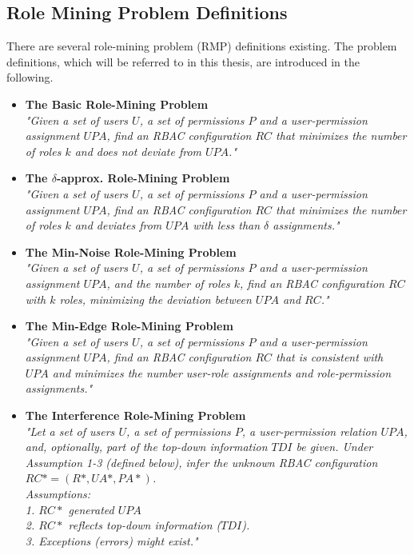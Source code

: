     \subsection{Role Mining Problem Definitions}
    \label{sec:roleMiningProblems}
    There are several role-mining problem (RMP) definitions existing. The problem definitions, which will be referred to in this thesis, are introduced in the following.
    \begin{itemize}
        \item \textbf{The Basic Role-Mining Problem}\cite{Vaidya:2007}\\
        \textit{"Given a set of users $U$, a set of permissions $P$ and a user-permission assignment $UPA$, find an RBAC configuration $RC$ that minimizes the number of roles $k$ and does not deviate from $UPA$."}
        
        \item \textbf{The $\delta$-approx. Role-Mining Problem}\cite{Vaidya:2007}\\
        \textit{"Given a set of users $U$, a set of permissions $P$ and a user-permission assignment $UPA$, find an RBAC configuration $RC$ that minimizes the number of roles $k$ and deviates from $UPA$ with less than $\delta$ assignments."}
        
        \item \textbf{The Min-Noise Role-Mining Problem}\cite{Vaidya:2007}\\
        \textit{"Given a set of users $U$, a set of permissions $P$ and a user-permission assignment $UPA$, and the number of roles $k$, find an RBAC configuration $RC$ with $k$ roles, minimizing the deviation between $UPA$ and $RC$."}
        
        \item \textbf{The Min-Edge Role-Mining Problem}\cite{4497438}\\
        \textit{"Given a set of users $U$, a set of permissions $P$ and a user-permission assignment $UPA$, find an RBAC configuration $RC$ that is consistent with $UPA$ and minimizes the number user-role assignments and role-permission assignments."}
        
        \item \textbf{The Interference Role-Mining Problem}\cite{Frank:2013}\\
        \textit{"Let a set of users $U$, a set of permissions $P$, a user-permission relation $UPA$, and, optionally, part of the top-down information $TDI$ be given. Under Assumption 1-3 (defined below), infer the unknown RBAC configuration $RC*=(R*, UA*, PA*)$.\\
        Assumptions:\\
        1. $RC*$ generated $UPA$\\
        2. $RC*$ reflects top-down information ($TDI$).\\
        3. Exceptions (errors) might exist."}
    \end{itemize}
